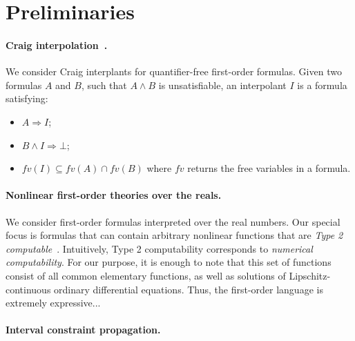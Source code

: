 \section{Preliminaries}
\label{sec:prelim}

\paragraph{Craig interpolation~\cite{MR0104564}.}
We consider Craig interplants for quantifier-free first-order formulas. Given two formulas $A$ and $B$, such that $A ∧ B$ is unsatisfiable, an interpolant $I$ is a formula satisfying:
\begin{itemize}
\item $A ⇒ I$;
\item $B ∧ I ⇒ ⊥$;
\item $fv(I) ⊆ fv(A) ∩ fv(B)$ where $fv$ returns the free variables in a formula.
\end{itemize}

\paragraph{Nonlinear first-order theories over the reals.} 

We consider first-order formulas interpreted over the real numbers. Our special focus is formulas that can contain arbitrary nonlinear functions that are {\em Type 2 computable}~\cite{CAbook,vasco}. Intuitively, Type 2 computability corresponds to {\em numerical computability}. For our purpose, it is enough to note that this set of functions consist of all common elementary functions, as well as solutions of Lipschitz-continuous ordinary differential equations. Thus, the first-order language is extremely expressive... 

\paragraph{Interval constraint propagation.}


